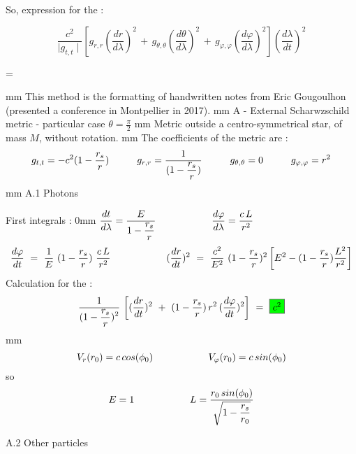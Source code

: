 \documentclass [12pt]{article}
\def\ph#1{\hskip #1}
\def\pv#1{\vskip #1}
\begin{document}
So, expression for the  :

$$\displaystyle\frac{c^2}{ \mid g_{t,t}\mid   } \left[   g_{r,r}   (\frac{dr}{d\lambda})^2 \,+\,   g_{\theta,\theta}   (\frac{d\theta}{d\lambda})^2\,+
\,   g_{\varphi,\varphi}   (\frac{d\varphi}{d\lambda})^2 \right] (\frac{d\lambda}{dt})^2 $$

\centerline{ =   }
\pv 3mm
This method is the formatting of handwritten notes from {\bidon Eric Gougoulhon}   (presented a conference in Montpellier in 2017).
\pv 5mm
{\bidon A - External Scharwzschild metric - particular case $\theta=\displaystyle\frac{\pi}{2} $} 
        \pv 3mm
				Metric outside a centro-symmetrical star, of mass $M$, without rotation.
\pv 2mm
				The coefficients of the metric are : 
				$$\displaystyle g_{t,t}= -c^2(1-\frac{r_s}{r}) \ph 10mm g_{r,r}= \frac{1}{(1-\displaystyle\frac{r_s}{r})} \ph 10mm
				g_{\theta,\theta}=0 \ph 10mm g_{\varphi,\varphi}=r^2 $$
								\pv 3mm
{\titre A.1  Photons} 

First integrals : \ph 30mm $ \displaystyle{dt\over d\lambda}= \displaystyle{E\over 1-\displaystyle{r_s\over r}}\ph 20mm {d\varphi\over d\lambda} = {c\,L\over r^2}$     
$${d\varphi\over dt}\ =\ {1\over E}\ (1-{r_s\over r})\ {c\,L\over r^2} \ph 20mm
({dr \over dt})^2 \ =\ {c^2\over E^2}\ (1-{r_s\over r})^2 \left[E^2-\displaystyle (1-{r_s\over r}){L^2\over r^2}\right] $$ 
Calculation for the   :
$$ \frac{1}{(1-\displaystyle\frac{r_s}{r})^2}\, \left[ ({dr \over dt})^2 \ + \ ({1-\frac{r_s}{r}})\,r^2\,({d\varphi\over dt})^2 \right]\ =\ \fcolorbox{black}{green}{$c^2$} $$
\pv 3mm
\hypertarget{A1photon}{}\pv -3mm
  $$V_r(r_0)=c\,cos(\phi_0) \ph 20mm  V_\varphi(r_0)=c\,sin(\phi_0)$$
  so  \pv -8mm
  $$E=1    \ph 20mm L=\displaystyle\frac{r_0\,sin(\phi_0)}{\sqrt{1-\displaystyle\frac{r_s}{r_0}}} $$

{\titre A.2  Other particles}
\end{document}

